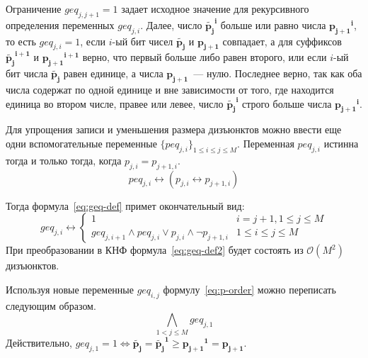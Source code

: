 Ограничение $\mathit{geq}_{j,j + 1} = 1$ задает исходное значение для рекурсивного определения переменных $\mathit{geq}_{j,i}$.
Далее, число $\tilde{\mathbf{p_{j}}}^{\mathbf{i}}$ больше или равно числа $\mathbf{p_{j + 1}}^{\mathbf{i}}$, то есть $\mathit{geq}_{j,i} = 1$, если $i$-ый бит чисел $\tilde{\mathbf{p_{j}}}$ и $\mathbf{p_{j + 1}}$ совпадает, а для суффиксов $\tilde{\mathbf{p_{j}}}^{\mathbf{i + 1}}$ и $\mathbf{p_{j + 1}}^{\mathbf{i + 1}}$ верно, что первый больше либо равен второго, или если $i$-ый бит числа $\tilde{\mathbf{p_{j}}}$ равен единице, а числа $\mathbf{p_{j + 1}}$~{---} нулю.
Последнее верно, так как оба числа содержат по одной единице и вне зависимости от того, где находится единица во втором числе, правее или левее, число $\tilde{\mathbf{p_{j}}}^{\mathbf{i}}$ строго больше числа $\mathbf{p_{j + 1}}^{\mathbf{i}}$.

Для упрощения записи и уменьшения размера дизъюнктов можно ввести еще одни вспомогательные переменные $\{\mathit{peq}_{j,i}\}_{1 \leq i \leq j \leq M}$.
Переменная $\mathit{peq}_{j,i}$ истинна тогда и только тогда, когда $p_{j,i} = p_{j + 1,i}$.
%
\begin{equation}
\label{eq:peq-def}
  \mathit{peq}_{j,i} \leftrightarrow \left(p_{j,i} \leftrightarrow p_{j + 1, i}\right) 
\end{equation}


Тогда формула~\eqref{eq:geq-def} примет окончательный вид:
%
\begin{equation}
\label{eq:geq-def2}
  \mathit{geq}_{j,i} \leftrightarrow 
    \begin{cases} 
      1                               & i = j + 1, 1 \leq j \leq M \\
      \mathit{geq}_{j,i + 1} \wedge \mathit{peq}_{j,i} \vee p_{j,i} \wedge \neg p_{j + 1, i}  & 1 \leq i \leq j \leq M
    \end{cases} 
\end{equation}
%
При преобразовании в КНФ формула~\eqref{eq:geq-def2} будет состоять из $\mathcal{O}\left(M^{2}\right)$ дизъюнктов.

Используя новые переменные $\mathit{geq}_{i,j}$ формулу~\eqref{eq:p-order} можно переписать следующим образом.
%
\begin{equation}
\label{eq:p-order-tight}
  \bigwedge_{1 < j \leq M} \mathit{geq}_{j,1}
\end{equation}
%
Действительно, $\mathit{geq}_{j,1} = 1 \Leftrightarrow \tilde{\mathbf{p_{j}}} = \tilde{\mathbf{p_{j}}}^\mathbf{1} \geq \mathbf{p_{j + 1}}^{\mathbf{1}} = \mathbf{p_{j + 1}}$.

